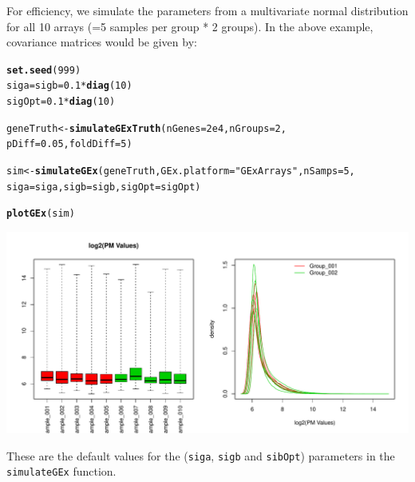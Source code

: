\documentclass{article}\usepackage[]{graphicx}\usepackage[usenames,dvipsnames]{color}
\makeatletter
\def\maxwidth{ %
  \ifdim\Gin@nat@width>\linewidth
    \linewidth
  \else
    \Gin@nat@width
  \fi
}
\newcommand{\hlnum}[1]{\textcolor[rgb]{0.686,0.059,0.569}{#1}}%
\newcommand{\hlstr}[1]{\textcolor[rgb]{0.192,0.494,0.8}{#1}}%
\newcommand{\hlopt}[1]{\textcolor[rgb]{0,0,0}{#1}}%
\newcommand{\hlstd}[1]{\textcolor[rgb]{0.345,0.345,0.345}{#1}}%
\newcommand{\hlkwb}[1]{\textcolor[rgb]{0.69,0.353,0.396}{#1}}%
\newcommand{\hlkwc}[1]{\textcolor[rgb]{0.333,0.667,0.333}{#1}}%
\newcommand{\hlkwd}[1]{\textcolor[rgb]{0.737,0.353,0.396}{\textbf{#1}}}%
\newenvironment{kframe}{%
 \def\at@end@of@kframe{}%
 \ifinner\ifhmode%
  \def\at@end@of@kframe{\end{minipage}}%
  \begin{minipage}{\columnwidth}%
 \fi\fi%
 \def\FrameCommand##1{\hskip\@totalleftmargin \hskip-\fboxsep
 \colorbox{shadecolor}{##1}\hskip-\fboxsep
     \hskip-\linewidth \hskip-\@totalleftmargin \hskip\columnwidth}%
 \MakeFramed {\advance\hsize-\width
   \@totalleftmargin\z@ \linewidth\hsize
   \@setminipage}}%
 {\par\unskip\endMakeFramed%
 \at@end@of@kframe}
\newenvironment{knitrout}{}{} %
\makeatother
\begin{document}
For efficiency, we simulate the parameters from a multivariate normal 
distribution for all 10 arrays (=5 samples per group * 2 groups). In the 
above example, covariance matrices would be given by:
\begin{knitrout}
\color{fgcolor}\begin{kframe}
\begin{alltt}
\hlkwd{set.seed}\hlstd{(}\hlnum{999}\hlstd{)}
\hlstd{siga} \hlkwb{=} \hlstd{sigb} \hlkwb{=} \hlnum{0.1} \hlopt{*} \hlkwd{diag}\hlstd{(}\hlnum{10}\hlstd{)}
\hlstd{sigOpt} \hlkwb{=} \hlnum{0.1} \hlopt{*} \hlkwd{diag}\hlstd{(}\hlnum{10}\hlstd{)}

\hlstd{geneTruth} \hlkwb{<-} \hlkwd{simulateGExTruth}\hlstd{(}\hlkwc{nGenes} \hlstd{=} \hlnum{2e4}\hlstd{,} \hlkwc{nGroups} \hlstd{=} \hlnum{2}\hlstd{,}
                              \hlkwc{pDiff} \hlstd{=} \hlnum{0.05}\hlstd{,} \hlkwc{foldDiff} \hlstd{=} \hlnum{5}\hlstd{)}
\end{alltt}


{\ttfamily\noindent\itshape\color{messagecolor}{\#\# [quantroSim]: Simulating RNA transcript counts using a Poisson \\\#\#\ \ \ \ \ \ \ \ \ \  distribution with mean parameters from 0.01 to 4662.66}}\begin{alltt}
\hlstd{sim} \hlkwb{<-} \hlkwd{simulateGEx}\hlstd{(geneTruth,}  \hlkwc{GEx.platform} \hlstd{=} \hlstr{"GExArrays"}\hlstd{,} \hlkwc{nSamps} \hlstd{=} \hlnum{5}\hlstd{,}
                   \hlkwc{siga} \hlstd{= siga,} \hlkwc{sigb} \hlstd{= sigb,} \hlkwc{sigOpt} \hlstd{= sigOpt)}
\end{alltt}


{\ttfamily\noindent\itshape\color{messagecolor}{\#\# Simulating gene expression samples using the GEx.platform: GExArrays\\\#\# No PCR amplification of RNA transcript counts.}}\begin{alltt}
\hlkwd{plotGEx}\hlstd{(sim)}
\end{alltt}
\end{kframe}
\includegraphics[width=\maxwidth]{figure/simGene-figs2-1} 

\end{knitrout}
These are the default values for the (\texttt{siga}, \texttt{sigb} 
and \texttt{sibOpt}) parameters in the \texttt{simulateGEx} function. 
\end{document}

